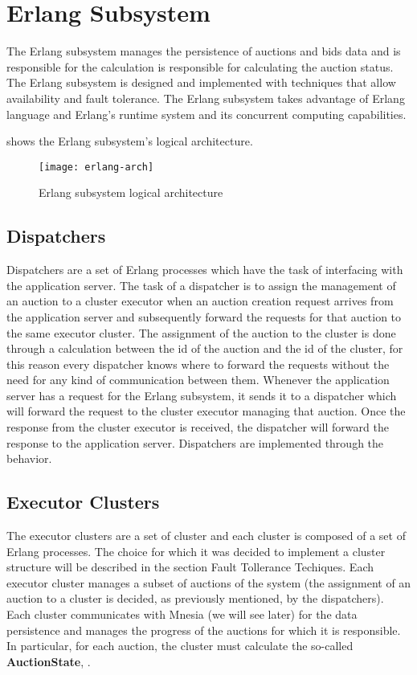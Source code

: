 \section{Erlang Subsystem}\label{sec:archerlang}

The Erlang subsystem manages the persistence of auctions and bids data and is
responsible for the calculation is responsible for calculating the auction
status. The Erlang subsystem is designed and implemented with techniques that
allow availability and fault tolerance. The Erlang subsystem takes advantage of
Erlang language and Erlang's runtime system and its concurrent computing
capabilities.

 shows the Erlang subsystem's logical architecture.

\begin{figure}[htb]
	\centering
	\texttt{[image: erlang-arch]}
	\caption{Erlang subsystem logical architecture}\label{fig:erlang-arch}
\end{figure}

\subsection{Dispatchers}

Dispatchers are a set of Erlang processes which have the task of interfacing
with the application server. The task of a dispatcher is to assign the
management of an auction to a cluster executor when an auction creation request
arrives from the application server and subsequently forward the requests for
that auction to the same executor cluster. The assignment of the auction to the
cluster is done through a calculation between the id of the auction and the id
of the cluster, for this reason every dispatcher knows where to forward the
requests without the need for any kind of communication between them. Whenever
the application server has a request for the Erlang subsystem, it sends it to a
dispatcher which will forward the request to the cluster executor managing that
auction. Once the response from the cluster executor is received, the dispatcher
will forward the response to the application server. Dispatchers are implemented
through the  behavior.

\subsection{Executor Clusters}

The executor clusters are a set of cluster and each cluster is composed of a set
of Erlang processes. The choice for which it was decided to implement a cluster
structure will be described in the section Fault Tollerance Techiques. Each
executor cluster manages a subset of auctions of the system (the assignment of
an auction to a cluster is decided, as previously mentioned, by the
dispatchers). Each cluster communicates with Mnesia (we will see later) for the
data persistence and manages the progress of the auctions for which it is
responsible. In particular, for each auction, the cluster must calculate the
so-called \textbf{AuctionState}, .


